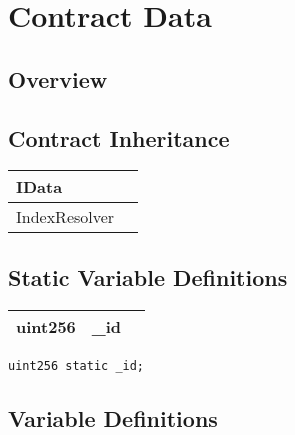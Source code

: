 
\chapter{Contract Data}

\minitoc

\section{Overview}




\section{Contract Inheritance}


\noindent\begin{tabular}{|l|p{5cm}|}\hline
IData & \\\hline
IndexResolver & \\\hline
\end{tabular}


\section{Static Variable Definitions}


\ifsoltables
\noindent\begin{tabular}{|l|l|p{5cm}|}\hline
uint256 & \_{}id &  \\\hline
\end{tabular}
\fi


\begin{lstlisting}[firstnumber=18]
    uint256 static _id;
\end{lstlisting}

\section{Variable Definitions}


